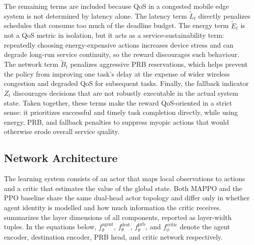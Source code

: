The remaining terms are included because QoS in a congested mobile edge system is not determined by latency alone. The latency term \(\widetilde{L}_t\) directly penalizes schedules that consume too much of the deadline budget. The energy term \(\widetilde{E}_t\) is not a QoS metric in isolation, but it acts as a service-sustainability term: repeatedly choosing energy-expensive actions increases device stress and can degrade long-run service continuity, so the reward discourages such behaviour. The network term \(\widetilde{B}_t\) penalizes aggressive PRB reservations, which helps prevent the policy from improving one task's delay at the expense of wider wireless congestion and degraded QoS for subsequent tasks. Finally, the fallback indicator \(Z_t\) discourages decisions that are not robustly executable in the actual system state. Taken together, these terms make the reward QoS-oriented in a strict sense: it prioritizes successful and timely task completion directly, while using energy, PRB, and fallback penalties to suppress myopic actions that would otherwise erode overall service quality.

\subsection{Network Architecture}
\label{subsec:network-architecture}

The learning system consists of an actor that maps local observations to actions and a critic that estimates the value of the global state. Both MAPPO and the PPO baseline share the same dual-head actor topology and differ only in whether agent identity is modelled and how much information the critic receives.  summarizes the layer dimensions of all components, reported as layer-width tuples. In the equations below, \(f_{\theta}^{\mathrm{agent}}\), \(f_{\theta}^{\mathrm{dest}}\), \(f_{\theta}^{\mathrm{prb}}\), and \(f_{\phi}^{\mathrm{critic}}\) denote the agent encoder, destination encoder, PRB head, and critic network respectively.


